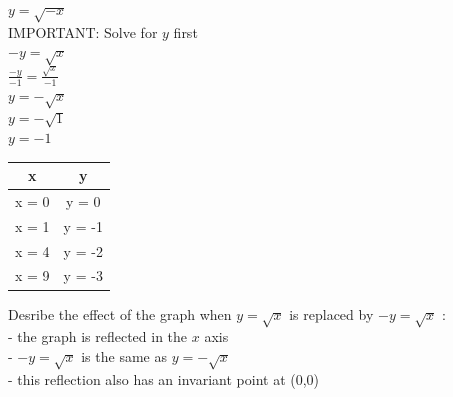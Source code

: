 \documentclass[10pt]{article}
\begin{document}
\(y = \sqrt{-x}\) \\
IMPORTANT: Solve for \(y\) first \\
\hspace*{1em} \(-y = \sqrt{x}\) \\
\hspace*{1em} \(\frac{-y}{-1} = \frac{\sqrt{x}}{-1}\) \\
\hspace*{1em} \(y = -\sqrt{x}\) \\
\hspace*{1em} \(y = -\sqrt{1}\) \\
\hspace*{1em} \(y = -1\) \\
\begin{tabular}{|c|c|}
    \hline
    x     & y      \\
    \hline
    x = 0 & y = 0  \\
    x = 1 & y = -1 \\
    x = 4 & y = -2 \\
    x = 9 & y = -3 \\
    \hline
\end{tabular}



Desribe the effect of the graph when \(y = \sqrt{x}\) is replaced by \(-y = \sqrt{x}\) : \\
- the graph is reflected in the \(x\) axis \\
- \(-y = \sqrt{x}\) is the same as \(y = -\sqrt{x}\) \\
- this reflection also has an invariant point at (0,0)
\clearpage
\end{document}
